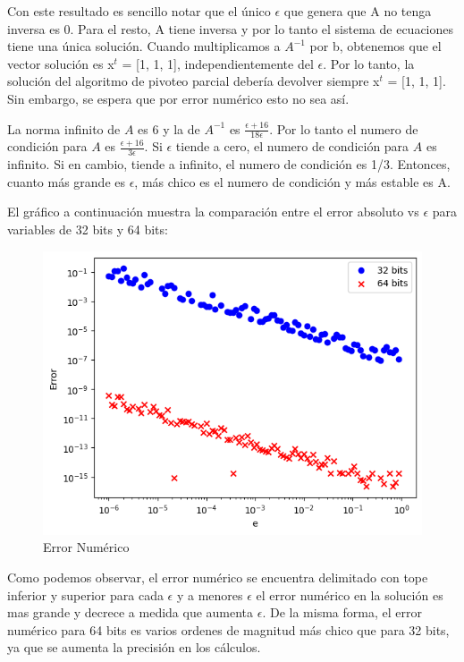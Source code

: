 Con este resultado es sencillo notar que el único $\epsilon$ que genera que A no tenga inversa es 0. Para el resto, A tiene inversa y por lo tanto el sistema de ecuaciones tiene una única solución. Cuando multiplicamos a $A^{-1}$ por b, obtenemos que el vector solución es x$^t$ = [1, 1, 1], independientemente del $\epsilon$. Por lo tanto, la solución del algoritmo de pivoteo parcial debería devolver siempre x$^t$ = [1, 1, 1]. Sin embargo, se espera que por error numérico esto no sea así. 

La norma infinito de $A$ es 6 y la de $A^{-1}$ es $\frac{\epsilon+16}{18\epsilon}$. Por lo tanto el numero de condición para $A$ es $\frac{\epsilon+16}{3\epsilon}$. Si $\epsilon$ tiende a cero, el numero de condición para $A$ es infinito. Si en cambio, tiende a infinito, el numero de condición es 1/3. Entonces, cuanto más grande es $\epsilon$, más chico es el numero de condición y más estable es A. 

El gráfico a continuación muestra la comparación entre el error absoluto vs $\epsilon$ para variables de 32 bits y 64 bits:

\begin{figure}[htbp]
\centerline{\includegraphics[scale=0.50]{./img/error_numerico_32vs64.png}}
\caption{Error Numérico}
\label{result_errorNumerico}
\end{figure}

Como podemos observar, el error numérico se encuentra delimitado con tope inferior y superior para cada $\epsilon$ y a menores $\epsilon$ el error numérico en la solución es mas grande y decrece a medida que aumenta $\epsilon$. De la misma forma, el error numérico para 64 bits es varios ordenes de magnitud más chico que para 32 bits, ya que se aumenta la precisión en los cálculos.



